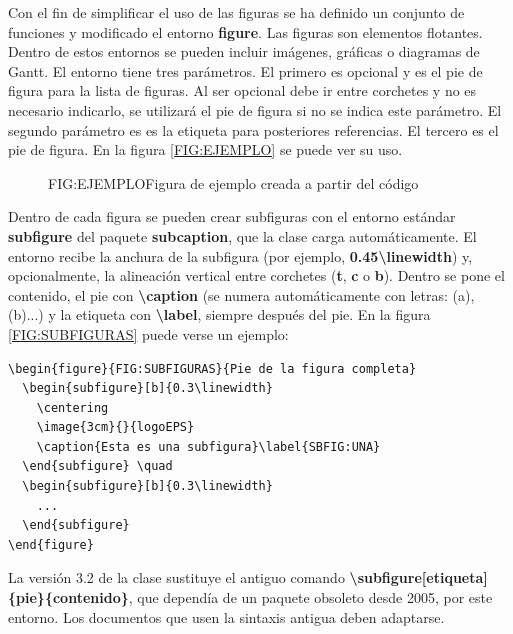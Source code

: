 Con el fin de simplificar el uso de las figuras se ha definido un conjunto de funciones y modificado el entorno \textbf{figure}. Las figuras son elementos flotantes. Dentro de estos entornos se pueden incluir imágenes, gráficas o diagramas de Gantt.
El entorno tiene tres parámetros. El primero es opcional y es el pie de figura para la lista de figuras. Al ser opcional debe ir entre corchetes y no es necesario indicarlo, se utilizará el pie de figura si no se indica este parámetro. El segundo parámetro es es la etiqueta para posteriores referencias. El tercero es el pie de figura. En la figura \ref{FIG:EJEMPLO} se puede ver su uso.

\begin{figure}[Ejemplo de uso de figure]{FIG:EJEMPLO}{Figura de ejemplo creada a partir del código}
\end{figure}

Dentro de cada figura se pueden crear subfiguras con el entorno estándar \textbf{subfigure} del paquete \textbf{subcaption}, que la clase carga automáticamente. El entorno recibe la anchura de la subfigura (por ejemplo, \textbf{0.45{\textbackslash}linewidth}) y, opcionalmente, la alineación vertical entre corchetes (\textbf{t}, \textbf{c} o \textbf{b}). Dentro se pone el contenido, el pie con \textbf{{\textbackslash}caption} (se numera automáticamente con letras: (a), (b)...) y la etiqueta con \textbf{{\textbackslash}label}, siempre después del pie. En la figura \ref{FIG:SUBFIGURAS} puede verse un ejemplo:

\begin{verbatim}
\begin{figure}{FIG:SUBFIGURAS}{Pie de la figura completa}
  \begin{subfigure}[b]{0.3\linewidth}
    \centering
    \image{3cm}{}{logoEPS}
    \caption{Esta es una subfigura}\label{SBFIG:UNA}
  \end{subfigure} \quad
  \begin{subfigure}[b]{0.3\linewidth}
    ...
  \end{subfigure}
\end{figure}
\end{verbatim}

La versión 3.2 de la clase sustituye el antiguo comando \textbf{{\textbackslash}subfigure}\textbf{[etiqueta]\{pie\}\{contenido\}}, que dependía de un paquete obsoleto desde 2005, por este entorno. Los documentos que usen la sintaxis antigua deben adaptarse.

